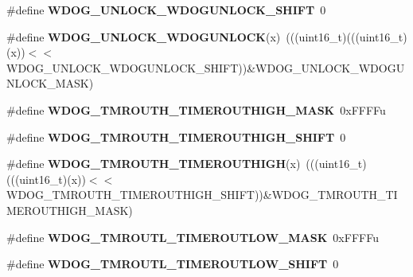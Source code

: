 \begin{DoxyCompactItemize}
\item 
\#define {\bfseries W\+D\+O\+G\+\_\+\+U\+N\+L\+O\+C\+K\+\_\+\+W\+D\+O\+G\+U\+N\+L\+O\+C\+K\+\_\+\+S\+H\+I\+FT}~0\hypertarget{group__WDOG__Register__Masks_ga07ed92839744d67e4c393b00bc293246}{}\label{group__WDOG__Register__Masks_ga07ed92839744d67e4c393b00bc293246}

\item 
\#define {\bfseries W\+D\+O\+G\+\_\+\+U\+N\+L\+O\+C\+K\+\_\+\+W\+D\+O\+G\+U\+N\+L\+O\+CK}(x)~(((uint16\+\_\+t)(((uint16\+\_\+t)(x))$<$$<$W\+D\+O\+G\+\_\+\+U\+N\+L\+O\+C\+K\+\_\+\+W\+D\+O\+G\+U\+N\+L\+O\+C\+K\+\_\+\+S\+H\+I\+FT))\&W\+D\+O\+G\+\_\+\+U\+N\+L\+O\+C\+K\+\_\+\+W\+D\+O\+G\+U\+N\+L\+O\+C\+K\+\_\+\+M\+A\+SK)\hypertarget{group__WDOG__Register__Masks_gad96dca67e74ad54ec68edec38214cbc6}{}\label{group__WDOG__Register__Masks_gad96dca67e74ad54ec68edec38214cbc6}

\item 
\#define {\bfseries W\+D\+O\+G\+\_\+\+T\+M\+R\+O\+U\+T\+H\+\_\+\+T\+I\+M\+E\+R\+O\+U\+T\+H\+I\+G\+H\+\_\+\+M\+A\+SK}~0x\+F\+F\+F\+Fu\hypertarget{group__WDOG__Register__Masks_ga4c46affdc0cd5ed2cde734812f783d31}{}\label{group__WDOG__Register__Masks_ga4c46affdc0cd5ed2cde734812f783d31}

\item 
\#define {\bfseries W\+D\+O\+G\+\_\+\+T\+M\+R\+O\+U\+T\+H\+\_\+\+T\+I\+M\+E\+R\+O\+U\+T\+H\+I\+G\+H\+\_\+\+S\+H\+I\+FT}~0\hypertarget{group__WDOG__Register__Masks_ga6565e44e33822cee4835856bfb88431e}{}\label{group__WDOG__Register__Masks_ga6565e44e33822cee4835856bfb88431e}

\item 
\#define {\bfseries W\+D\+O\+G\+\_\+\+T\+M\+R\+O\+U\+T\+H\+\_\+\+T\+I\+M\+E\+R\+O\+U\+T\+H\+I\+GH}(x)~(((uint16\+\_\+t)(((uint16\+\_\+t)(x))$<$$<$W\+D\+O\+G\+\_\+\+T\+M\+R\+O\+U\+T\+H\+\_\+\+T\+I\+M\+E\+R\+O\+U\+T\+H\+I\+G\+H\+\_\+\+S\+H\+I\+FT))\&W\+D\+O\+G\+\_\+\+T\+M\+R\+O\+U\+T\+H\+\_\+\+T\+I\+M\+E\+R\+O\+U\+T\+H\+I\+G\+H\+\_\+\+M\+A\+SK)\hypertarget{group__WDOG__Register__Masks_ga6d47e0fbb5b3a15c1bec6418031960a0}{}\label{group__WDOG__Register__Masks_ga6d47e0fbb5b3a15c1bec6418031960a0}

\item 
\#define {\bfseries W\+D\+O\+G\+\_\+\+T\+M\+R\+O\+U\+T\+L\+\_\+\+T\+I\+M\+E\+R\+O\+U\+T\+L\+O\+W\+\_\+\+M\+A\+SK}~0x\+F\+F\+F\+Fu\hypertarget{group__WDOG__Register__Masks_gaf33faad844e2af36af7af5c6bf49a361}{}\label{group__WDOG__Register__Masks_gaf33faad844e2af36af7af5c6bf49a361}

\item 
\#define {\bfseries W\+D\+O\+G\+\_\+\+T\+M\+R\+O\+U\+T\+L\+\_\+\+T\+I\+M\+E\+R\+O\+U\+T\+L\+O\+W\+\_\+\+S\+H\+I\+FT}~0\hypertarget{group__WDOG__Register__Masks_gae4a9f52d3b15e28932d287dee4128e8a}{}\label{group__WDOG__Register__Masks_gae4a9f52d3b15e28932d287dee4128e8a}


\end{DoxyCompactItemize}
